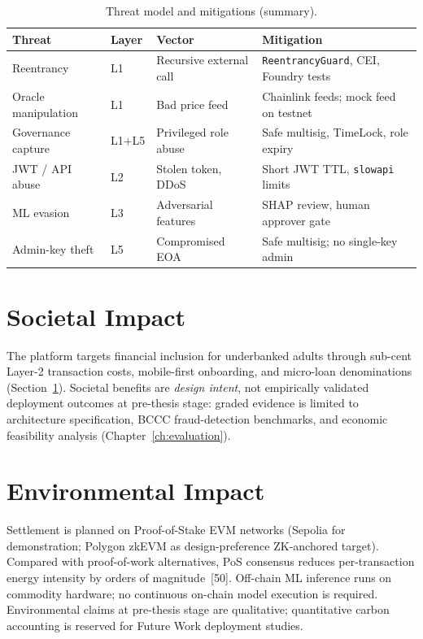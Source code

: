 \documentclass[12pt,a4paper]{report}
\newcommand{\tableheadcolor}{\rowcolor{TableHeadBg}}
\begin{document}
\begin{table}[H]
\centering
\caption[Threat model (summary)]{Threat model and mitigations (summary).}
\label{tab:threat-model}
\footnotesize
\begin{tabular}{@{}p{2.4cm}p{1.0cm}p{3.2cm}p{6.8cm}@{}}
\toprule
\tableheadcolor
\textbf{Threat} & \textbf{Layer} & \textbf{Vector} & \textbf{Mitigation} \\
\midrule
Reentrancy & L1 & Recursive external call & \texttt{ReentrancyGuard}, CEI, Foundry tests \\
Oracle manipulation & L1 & Bad price feed & Chainlink feeds; mock feed on testnet \\
Governance capture & L1+L5 & Privileged role abuse & Safe multisig, TimeLock, role expiry \\
JWT / API abuse & L2 & Stolen token, DDoS & Short JWT TTL, \texttt{slowapi} limits \\
ML evasion & L3 & Adversarial features & SHAP review, human approver gate \\
Admin-key theft & L5 & Compromised EOA & Safe multisig; no single-key admin \\
\bottomrule
\end{tabular}
\end{table}


\section{Societal Impact}
\label{sec:societal-impact}

The platform targets financial inclusion for underbanked adults through sub-cent Layer-2 transaction costs, mobile-first onboarding, and micro-loan denominations (Section~\ref{sec:societal-impact}). Societal benefits are \textit{design intent}, not empirically validated deployment outcomes at pre-thesis stage: graded evidence is limited to architecture specification, BCCC fraud-detection benchmarks, and economic feasibility analysis (Chapter~\ref{ch:evaluation}).

\section{Environmental Impact}
\label{sec:environmental-impact}

Settlement is planned on Proof-of-Stake EVM networks (Sepolia for demonstration; Polygon zkEVM as design-preference ZK-anchored target). Compared with proof-of-work alternatives, PoS consensus reduces per-transaction energy intensity by orders of magnitude~[50]. Off-chain ML inference runs on commodity hardware; no continuous on-chain model execution is required. Environmental claims at pre-thesis stage are qualitative; quantitative carbon accounting is reserved for Future Work deployment studies.
\end{document}
